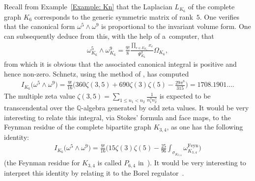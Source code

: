 \documentclass[pdftex]{sigma}%
\numberwithin{equation}{section}
\newcommand{\Q}{\mathbb Q}
\newcommand{\0}{\color{blue}{\mathsf{0}}}
\begin{document}
Recall from Example~\ref{Example: Kn} that the Laplacian $L_{K_6}$ of the complete graph $K_6$ corresponds to the generic symmetric matrix of rank~$5$.
 One verifies that the canonical form $\omega^5 \wedge \omega^9$ is proportional to the invariant volume form. One can subsequently deduce from this, with the help of a~computer, that
 \begin{gather*}
 \omega_{K_6}^5 \wedge \omega^9_{K_6} = \frac{9!}{8} \frac{\prod_{e \in E_{K_6}} x_e }{\Psi_{K_6}^3} \Omega_{K_6} ,
 \end{gather*}
from which it is obvious that the associated canonical integral is positive and hence non-zero.
 Schnetz, using the method of \cite{BorinskySchnetz}, has computed
 \begin{gather*}
 I_{K_6} \big(\omega^5 \wedge \omega^9\big) = \frac{9!}{16}\bigg(360 \zeta(3,5)+690 \zeta(3)\zeta(5)- \frac{29 \pi^8}{315}\bigg)=1708.1901\dots.
 \end{gather*}
 The multiple zeta value $\zeta(3,5) =\sum_{1\leq n_1<n_2}\frac{1}{n_1^3n_2^5}$ is expected to be transcendental over the $\Q$-algebra generated by odd zeta values.
 It would be very interesting to relate this integral, via Stokes' formula and face maps, to the Feynman residue of the complete bipartite graph $K_{3,4}$, as one has the following identity:
 \begin{gather*}
 I_{K_6} \big(\omega^5 \wedge \omega^9\big) = \frac{9!}{16}\bigg(15 \zeta(3)\zeta(5)-\frac{25}{96} \int_{\sigma_{K_{3,4}}} \omega^{\mathrm{Feyn}}_{K_{3,4}} \bigg)
 \end{gather*}
 (the Feynman residue for $K_{3,4}$ is called $P_{6,4}$ in~\cite{Schnetz}). It would be very interesting to interpret this identity by relating it to the
 Borel regulator~\cite{Siegel}.
\end{document}
